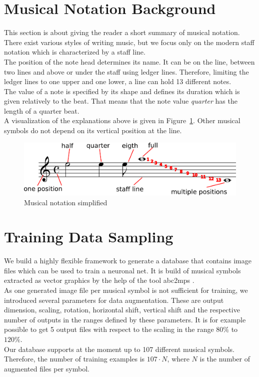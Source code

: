 \documentclass[twocolumn]{article}
\begin{document}
\section{Musical Notation Background}
This section is about giving the reader a short summary of musical notation.\\
There exist various styles of writing music, but we focus only on the modern staff notation which is characterized by a staff line. \\
The position of the note head determines its name. It can be on the line, between two lines and above or under the staff using ledger lines. Therefore, limiting the ledger lines to one upper and one lower, a line can hold 13 different notes. \\
The value of a note is specified by its shape and defines its duration which is given relatively to the beat. That means that the note value \textit{quarter} has the length of a quarter beat. \\
A visualization of the explanations above is given in Figure~\ref{musical_notation}. 
Other musical symbols do not depend on its vertical position at the line. 


\begin{figure}
 \includegraphics[width=\linewidth]{notation.png}
 \caption{Musical notation simplified}
 \label{musical_notation}
\end{figure}

\section{Training Data Sampling}
We build a highly flexible framework to generate a database that contains image files which can be used to train a neuronal net. It is build of musical symbols extracted as vector graphics by the help of the tool abc2mps \citet{abc2mps}. \\
As one generated image file per musical symbol is not sufficient for training, we introduced several parameters for data augmentation. These are output dimension, scaling, rotation, horizontal shift, vertical shift and the respective number of outputs in the ranges defined by these parameters. It is for example possible to get 5 output files with respect to the scaling in the range $80\%$ to $120\%$. \\
Our database supports at the moment up to 107 different musical symbols. Therefore, the number of training examples is $107 \cdot N$, where $N$ is the number of augmented files per symbol. 
\end{document}
